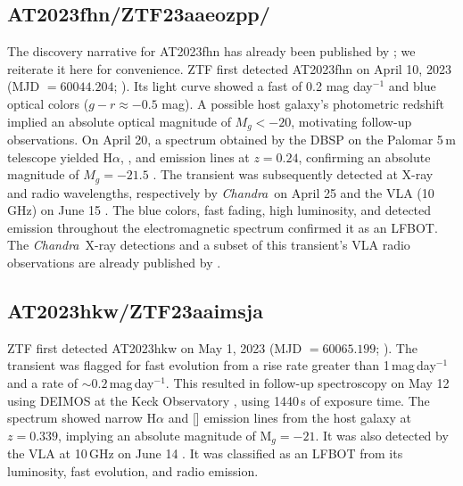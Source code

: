 \documentclass[twocolumn,twocolappendix, linenumbers, trackchanges]{aastex7}
\newcommand{\chandra}{\emph{Chandra}}
\begin{document}
\subsection{AT2023fhn/ZTF23aaeozpp/}
The discovery narrative for AT2023fhn has already been published by \citet{chrimesfhn}; we reiterate it here for convenience.  ZTF first detected AT2023fhn on April 10, 2023 (MJD $=60044.204$; \citealt{astro2023fhn_disc}).  Its light curve showed a fast  of 0.2 mag day$^{-1}$ and blue optical colors ($g-r \approx -0.5$ mag).  A possible host galaxy's photometric redshift implied an absolute optical magnitude of $M_g <-20$, motivating follow-up observations.  On April 20, a spectrum obtained by the DBSP on the Palomar 5\,m %
telescope yielded H$\alpha$, , and  emission lines at $z=0.24$, confirming an absolute magnitude of $M_g=-21.5$ \citep{astro2023fhn_p200}.  The transient was subsequently detected at X-ray and radio wavelengths, respectively by \chandra\ on April 25 \citep{astro2023fhn_chandra} and the VLA (10 GHz) on June 15 \citep{astro2023fhn_vla}.  The blue colors, fast fading, high luminosity, and detected emission throughout the electromagnetic spectrum confirmed it as an LFBOT.  The \chandra\ X-ray detections and a subset of this transient's VLA radio observations are already published by \citet{chrimes2024}.


\subsection{AT2023hkw/ZTF23aaimsja}
ZTF first detected AT2023hkw on May 1, 2023 (MJD $=60065.199$; \citealt{astro2023hkw_disc}).  The transient was flagged for fast evolution from a rise rate greater than 1\,mag\,day$^{-1}$ and a  rate of $\sim 0.2$\,mag\,day$^{-1}$.  This resulted in follow-up spectroscopy on May 12 using DEIMOS at the Keck Observatory %
\citep{astro2023hkw_keck}, using 1440\,s of exposure time.  The spectrum showed narrow H$\alpha$ and [] emission lines from the host galaxy at $z=0.339$, implying an absolute magnitude of $\mathrm{M}_g=-21$.  It was also detected by the VLA at 10\,GHz on June 14 \citep{astro2023hkw_vla}.  It was classified as an LFBOT from its luminosity, fast evolution, and radio emission.
\end{document}
